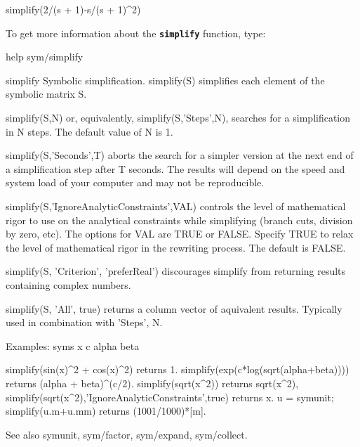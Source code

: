 \documentclass{article}
\begin{document}
\begin{matlabcode}
simplify(2/(s + 1)-s/(s + 1)^2)
\end{matlabcode}


\begin{par}
\begin{flushleft}
To get more information about the \texttt{\textbf{simplify}} function, type:
\end{flushleft}
\end{par}

\begin{matlabcode}
help sym/simplify
\end{matlabcode}
\begin{matlaboutput}
 simplify Symbolic simplification.
    simplify(S) simplifies each element of the symbolic matrix S.
    
    simplify(S,N) or, equivalently, simplify(S,'Steps',N),
    searches for a simplification in N steps. The default value of N is 1.
    
    simplify(S,'Seconds',T) aborts the search for a simpler version
    at the next end of a simplification step after T seconds. The results
    will depend on the speed and system load of your computer and may
    not be reproducible.
    
    simplify(S,'IgnoreAnalyticConstraints',VAL) controls the level of 
    mathematical rigor to use on the analytical constraints while simplifying 
    (branch cuts, division by zero, etc). The options for VAL are TRUE or 
    FALSE. Specify TRUE to relax the level of mathematical rigor
    in the rewriting process. The default is FALSE.
    
    simplify(S, 'Criterion', 'preferReal') 
    discourages simplify from returning results 
    containing complex numbers.
 
    simplify(S, 'All', true) 
    returns a column vector of aquivalent results. Typically used in
    combination with 'Steps', N.
 
    Examples: 
       syms x c alpha beta
 
       simplify(sin(x)^2 + cos(x)^2)  returns  1.
       simplify(exp(c*log(sqrt(alpha+beta))))  returns  (alpha + beta)^(c/2).
       simplify(sqrt(x^2))  returns  sqrt(x^2),
       simplify(sqrt(x^2),'IgnoreAnalyticConstraints',true)  returns  x.
       u = symunit;
       simplify(u.m+u.mm) returns  (1001/1000)*[m].
 
    See also symunit, sym/factor, sym/expand, sym/collect.
\end{matlaboutput}
\end{document}
